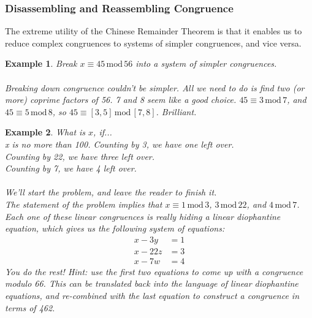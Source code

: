 \documentclass{article}
\newtheorem{example}{Example}
\newcommand{\X}[1]{\, \text{mod} \, #1}
\begin{document}
\subsubsection*{Disassembling and Reassembling Congruence} 
The extreme utility of the Chinese Remainder Theorem is that it enables us to reduce complex congruences to systems of simpler congruences, and vice versa. 
\begin{mdframed} 
\begin{example} 
Break $x\equiv 45\X{56}$ into a system of simpler congruences. \\\\
Breaking down congruence couldn't be simpler. All we need to do is find two (or more) coprime factors of 56. 7 and 8 seem like a good choice. $45\equiv 3\X{7}$, and $45\equiv5\X{8}$, so $45\equiv[3, 5]\X{[7, 8]}$. Brilliant. 
\end{example} 
\end{mdframed} 
\begin{mdframed}
\begin{example} 
What is $x$, if... \\
x is no more than 100. 
Counting by 3, we have one left over. \\
Counting by 22, we have three left over. \\
Counting by 7, we have 4 left over.\\\\
We'll start the problem, and leave the reader to finish it. \\
The statement of the problem implies that $x\equiv 1\X{3}$, $3\X{22}$, and $4\X{7}$. Each one of these linear congruences is really hiding a linear diophantine equation, which gives us the following system of equations: 
\begin{align*} 
x - 3y &= 1 \\
x - 22z &= 3 \\
x - 7w &= 4
\end{align*} 
You do the rest! Hint: use the first two equations to come up with a congruence modulo 66. This can be translated back into the language of linear diophantine equations, and re-combined with the last equation to construct a congruence in terms of 462. 
\end{example} 
\end{mdframed} 
\end{document}
